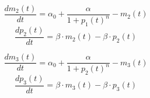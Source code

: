 \documentclass[12pt]{article}
\begin{document}
    \begin{multicols}{2}
    \begin{equation*}
    \frac{dm_{2}(t)}{dt} = \alpha_{0} + \frac{\alpha}{1 + p_{1}(t)^{n}} - m_{2}(t)
    \end{equation*}\break
    \begin{equation*}
    \frac{dp_{2}(t)}{dt} = \beta \cdot m_{2}(t) - \beta \cdot p_{2}(t)
    \end{equation*}
    \end{multicols}
    
    \begin{multicols}{2}
    \begin{equation*}
    \frac{dm_{3}(t)}{dt} = \alpha_{0} + \frac{\alpha}{1 + p_{2}(t)^{n}} - m_{3}(t)
    \end{equation*}\break
    \begin{equation*}
    \frac{dp_{3}(t)}{dt} = \beta \cdot m_{3}(t) - \beta \cdot p_{3}(t)
    \end{equation*}
    \end{multicols}
    

\end{document}
